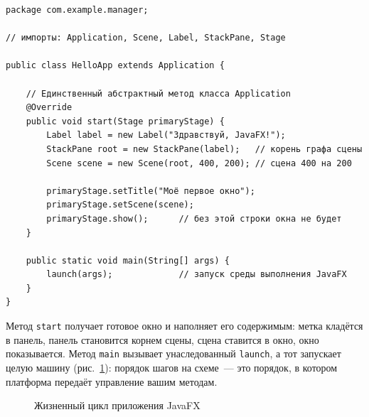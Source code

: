 \begin{listing}[H]
\begin{verbatim}
package com.example.manager;

// импорты: Application, Scene, Label, StackPane, Stage

public class HelloApp extends Application {

    // Единственный абстрактный метод класса Application
    @Override
    public void start(Stage primaryStage) {
        Label label = new Label("Здравствуй, JavaFX!");
        StackPane root = new StackPane(label);   // корень графа сцены
        Scene scene = new Scene(root, 400, 200); // сцена 400 на 200

        primaryStage.setTitle("Моё первое окно");
        primaryStage.setScene(scene);
        primaryStage.show();      // без этой строки окна не будет
    }

    public static void main(String[] args) {
        launch(args);             // запуск среды выполнения JavaFX
    }
}
\end{verbatim}
\caption{Минимальное приложение JavaFX}
\label{lst:09-3}
\end{listing}

Метод \texttt{start} получает готовое окно и наполняет его содержимым: метка
кладётся в панель, панель становится корнем сцены, сцена ставится в окно, окно
показывается. Метод \texttt{main} вызывает унаследованный \texttt{launch}, а тот
запускает целую машину (рис.~\ref{fig:09-2}): порядок шагов на схеме~--- это
порядок, в котором платформа передаёт управление вашим методам.

\begin{figure}[htbp]\centering
{}
\caption{Жизненный цикл приложения JavaFX}\label{fig:09-2}
\end{figure}

